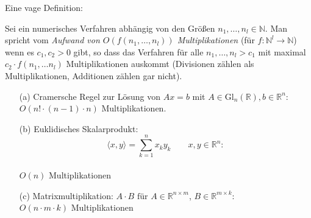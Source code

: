 \documentclass[11pt]{scrartcl}
\newcommand*{\NN}{\mathbb N}
\newcommand*{\RR}{\mathbb R}
\newcommand*{\Gl}{\mathrm{Gl}}
\theoremstyle{break}
\theoremstyle{remark}
\begin{document}
Eine vage Definition:

\begin{Definition}[Aufwand]
Sei ein numerisches Verfahren abhängig von den Größen $n_1, \ldots, n_l \in \NN$.
Man spricht vom
\emph{Aufwand von $O(f(n_1, \dots, n_l))$ Multiplikationen}
(für $f\colon \mathbb{N}^l \to \mathbb{N}$) wenn es
$c_1, c_2 > 0$ gibt, so dass das Verfahren für alle
$n_1, \dots, n_l > c_1$ mit maximal $c_2 \cdot f(n_1, \dots n_l)$
Multiplikationen auskommt (Divisionen zählen als Multiplikationen,
Additionen zählen gar nicht).
\end{Definition}

\begin{Beispiel}
\begin{enumerate}
\item[(a)]
Cramersche Regel zur Lösung von $Ax = b$ mit $A \in \Gl_n(\RR),
b \in \mathbb{R}^n$: \\
$O(n! \cdot (n-1)\cdot n)$ Multiplikationen.
\item[(b)]
Euklidisches Skalarprodukt:
$$\langle x,y \rangle = \sum_{k=1}^n x_k y_k \qquad x,y \in \mathbb{R}^n:$$ \\
$O(n)$ Multiplikationen
\item[(c)]
Matrixmultiplikation: $A \cdot B \text{ für } A\in
\mathbb{R}^{n \times m}$, $B \in \mathbb{R}^{m \times k}$: \\
$O(n \cdot m \cdot k ) $ Multiplikationen
\end{enumerate}
\end{Beispiel}
\end{document}
